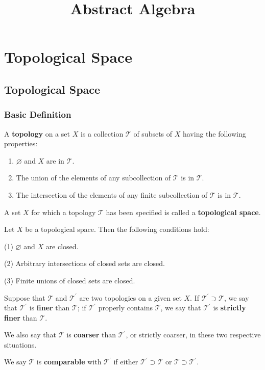 \documentclass[12pt, a4paper, oneside]{book}
\begin{document}
\frontmatter
\title{{\Huge{\textbf{Abstract Algebra}}}}
\maketitle
{}
\tableofcontents %


\mainmatter
{} %



\chapter{Topological Space}
\section{Topological Space}
\subsection{Basic Definition}
\begin{definition}
    A \textbf{topology} on a set $X$ is a collection $\mathcal{T}$ of subsets of $X$ having the following properties:
    \begin{enumerate}[label=(\roman*)]
        \item $\varnothing$ and $X$ are in $\mathcal{T}$.
        \item  The union of the elements of any subcollection of $\mathcal{T}$ is in $\mathcal{T}$.
        \item The intersection of the elements of any finite subcollection of $\mathcal{T}$ is in $\mathcal{T}$.
    \end{enumerate}
    A set $X$ for which a topology $\mathcal{T}$ has been specified is called a \textbf{topological space}.
\end{definition}

\begin{proposition}
    Let $X$ be a topological space. Then the following conditions hold:

    (1) $\varnothing$ and $X$ are closed.

    (2) Arbitrary intersections of closed sets are closed.

    (3) Finite unions of closed sets are closed.
\end{proposition}


\begin{definition}
    Suppose that $\mathcal{T}$ and $\mathcal{T}^{\prime}$ are two topologies on a given set $X$. If $\mathcal{T}^{\prime} \supset \mathcal{T}$, we say that $\mathcal{T}^{\prime}$ is \textbf{finer} than $\mathcal{T}$; if $\mathcal{T}^{\prime}$ properly contains $\mathcal{T}$, we say that $\mathcal{T}^{\prime}$ is \textbf{strictly finer} than $\mathcal{T}$.

    We also say that $\mathcal{T}$ is \textbf{coarser} than $\mathcal{T}^{\prime}$, or strictly coarser, in these two respective situations.

    We say $\mathcal{T}$ is \textbf{comparable} with $\mathcal{T}^{\prime}$ if either $\mathcal{T}^{\prime} \supset \mathcal{T}$ or $\mathcal{T} \supset \mathcal{T}^{\prime}$.
\end{definition}
\end{document}
